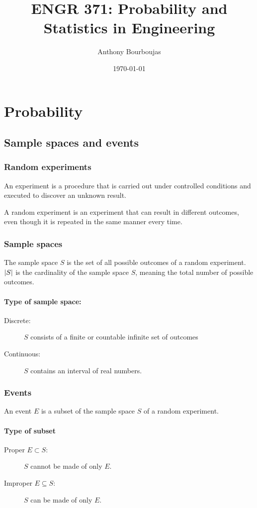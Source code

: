 \documentclass[10pt, twocolumn]{article}
\title{ENGR 371: Probability and Statistics in Engineering}
\date{\today}
\author{Anthony Bourboujas}
\begin{document}
\maketitle %

\section{Probability}
\subsection{Sample spaces and events}
\subsubsection{Random experiments}
An experiment is a procedure that is carried out under controlled conditions and executed to discover an unknown result.

A random experiment is an experiment that can result in different outcomes, even though it is repeated in the same manner every time.


\subsubsection{Sample spaces}
The sample space \(S\) is the set of all possible outcomes of a random experiment.
\(\left| S \right|\) is the cardinality of the sample space \(S\), meaning the total number of possible outcomes.

\paragraph{Type of sample space:}
\begin{description}
  \item[Discrete:] \(S\) consists of a finite or countable infinite set of outcomes
  \item[Continuous:] \(S\) contains an interval of real numbers.
\end{description}


\subsubsection{Events}
An event \(E\) is a subset of the sample space \(S\) of a random experiment.

\paragraph{Type of subset}
\begin{description}
  \item[Proper \(E \subset S\):] \(S\) cannot be made of only \(E\).
  \item[Improper \(E \subseteq S\):] \(S\) can be made of only \(E\).
\end{description}
\end{document}
